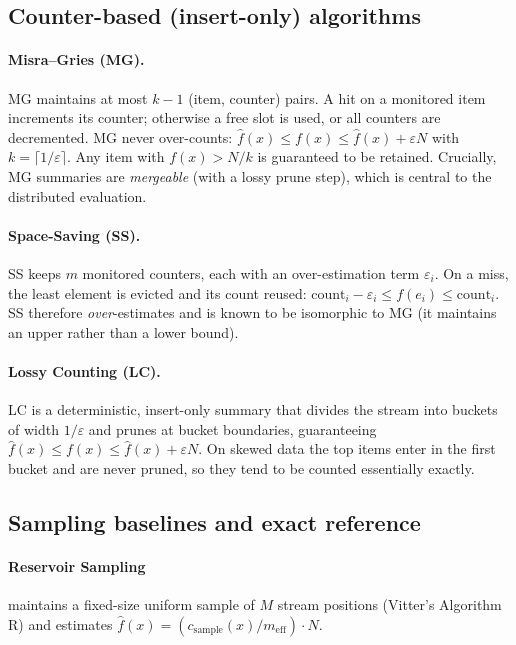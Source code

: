 \documentclass[12pt]{article}
\begin{document}
\subsection{Counter-based (insert-only) algorithms}

\paragraph{Misra--Gries (MG).}
MG maintains at most $k-1$ (item, counter) pairs. A hit on a monitored item
increments its counter; otherwise a free slot is used, or all counters are
decremented. MG never over-counts:
$\hat f(x) \le f(x) \le \hat f(x) + \varepsilon N$ with
$k = \lceil 1/\varepsilon\rceil$. Any item with $f(x) > N/k$ is guaranteed to be
retained. Crucially, MG summaries are \emph{mergeable} (with a lossy prune step),
which is central to the distributed evaluation.

\paragraph{Space-Saving (SS).}
SS keeps $m$ monitored counters, each with an over-estimation term
$\varepsilon_i$. On a miss, the least element is evicted and its count reused:
$\text{count}_i - \varepsilon_i \le f(e_i) \le \text{count}_i$. SS therefore
\emph{over}-estimates and is known to be isomorphic to MG (it maintains an upper
rather than a lower bound).

\paragraph{Lossy Counting (LC).}
LC is a deterministic, insert-only summary that divides the stream into buckets
of width $1/\varepsilon$ and prunes at bucket boundaries, guaranteeing
$\hat f(x) \le f(x) \le \hat f(x) + \varepsilon N$. On skewed data the top items
enter in the first bucket and are never pruned, so they tend to be counted
essentially exactly.

\subsection{Sampling baselines and exact reference}

\paragraph{Reservoir Sampling} maintains a fixed-size uniform sample of $M$
stream positions (Vitter's Algorithm R) and estimates
$\hat f(x) = (c_{\text{sample}}(x)/m_{\text{eff}})\cdot N$.
\end{document}
